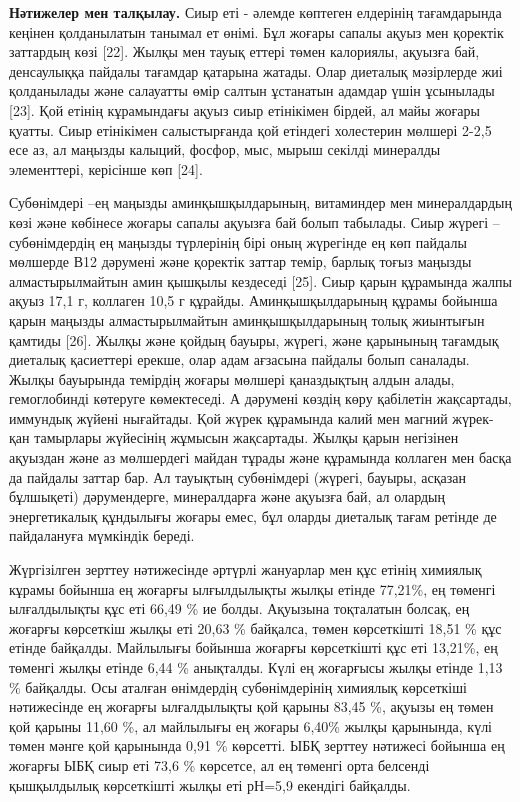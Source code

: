 \begin{multicols}{2}
{\bfseries Нәтижелер мен талқылау.} Сиыр еті - әлемде көптеген елдерінің
тағамдарында кеңінен қолданылатын танымал ет өнімі. Бұл жоғары сапалы
ақуыз мен қоректік заттардың көзі {[}22{]}. Жылқы мен тауық еттері төмен
калориялы, ақуызға бай, денсаулыққа пайдалы тағамдар қатарына жатады.
Олар диеталық мәзірлерде жиі қолданылады және салауатты өмір салтын
ұстанатын адамдар үшін ұсынылады {[}23{]}. Қой етінің кұрамындағы ақуыз
сиыр етінікімен бірдей, ал майы жоғары қуатты. Сиыр етінікімен
салыстырғанда қой етіндегі холестерин мөлшері 2-2,5 есе аз, ал маңызды
калыций, фосфор, мыс, мырыш секілді минералды элементтері, керісінше көп
{[}24{]}.

Субөнімдері --ең маңызды аминқышқылдарының, витаминдер мен минералдардың
көзі және көбінесе жоғары сапалы ақуызға бай болып табылады. Сиыр жүрегі
-- субөнімдердің ең маңызды түрлерінің бірі оның жүрегінде ең көп
пайдалы мөлшерде В12 дәрумені және қоректік заттар темір, барлық тоғыз
маңызды алмастырылмайтын амин қышқылы кездеседі {[}25{]}. Сиыр қарын
құрамында жалпы ақуыз 17,1 г, коллаген 10,5 г құрайды. Аминқышқылдарының
құрамы бойынша қарын маңызды алмастырылмайтын аминқышқылдарының толық
жиынтығын қамтиды {[}26{]}. Жылқы және қойдың бауыры, жүрегі, және
қарынының тағамдық диеталық қасиеттері ерекше, олар адам ағзасына
пайдалы болып саналады. Жылқы бауырында темірдің жоғары мөлшері
қаназдықтың алдын алады, гемоглобинді көтеруге көмектеседі. А дәрумені
көздің көру қабілетін жақсартады, иммундық жүйені нығайтады. Қой жүрек
құрамында калий мен магний жүрек-қан тамырлары жүйесінің жұмысын
жақсартады. Жылқы қарын негізінен ақуыздан және аз мөлшердегі майдан
тұрады және құрамында коллаген мен басқа да пайдалы заттар бар. Ал
тауықтың субөнімдері (жүрегі, бауыры, асқазан бұлшықеті) дәрумендерге,
минералдарға және ақуызға бай, ал олардың энергетикалық құндылығы жоғары
емес, бұл оларды диеталық тағам ретінде де пайдалануға мүмкіндік береді.

Жүргізілген зерттеу нәтижесінде әртүрлі жануарлар мен құс етінің
химиялық кұрамы бойынша ең жоғарғы ылғылдылықты жылқы етінде 77,21\%, ең
төменгі ылғалдылықты құс еті 66,49 \% ие болды. Ақуызына тоқталатын
болсақ, ең жоғарғы көрсеткіш жылқы еті 20,63 \% байқалса, төмен
көрсеткішті 18,51 \% құс етінде байқалды. Майлылығы бойынша жоғарғы
көрсеткішті құс еті 13,21\%, ең төменгі жылқы етінде 6,44 \% анықталды.
Күлі ең жоғарғысы жылқы етінде 1,13 \% байқалды. Осы аталған өнімдердің
субөнімдерінің химиялық көрсеткіші нәтижесінде ең жоғарғы ылғалдылықты
қой қарыны 83,45 \%, ақуызы ең төмен қой қарыны 11,60 \%, ал майлылығы
ең жоғары 6,40\% жылқы қарынында, күлі төмен мәнге қой қарынында 0,91 \%
көрсетті. ЫБҚ зерттеу нәтижесі бойынша ең жоғарғы ЫБҚ сиыр еті 73,6 \%
көрсетсе, ал ең төменгі орта белсенді қышқылдылық көрсеткішті жылқы еті
рН=5,9 екендігі байқалды.


\end{multicols}
